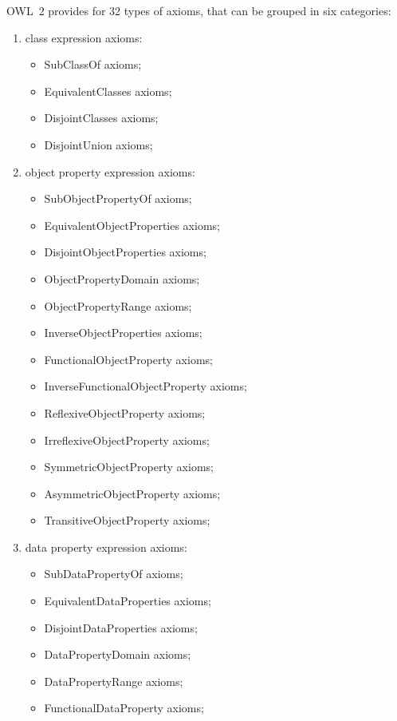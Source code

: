 \documentclass[a4paper]{article}
\newcounter{ex}
\begin{document}
OWL~2 provides for 32 types of axioms, that can be grouped in six categories:
\begin{enumerate}
\item class expression axioms:
  \begin{itemize}
  \item \textsf{SubClassOf} axioms;
  \item \textsf{EquivalentClasses} axioms;
  \item \textsf{DisjointClasses} axioms;
  \item \textsf{DisjointUnion} axioms;
  \end{itemize}
\item object property expression axioms:
  \begin{itemize}
  \item \textsf{SubObjectPropertyOf} axioms;
  \item \textsf{EquivalentObjectProperties} axioms;
  \item \textsf{DisjointObjectProperties} axioms;
  \item \textsf{ObjectPropertyDomain} axioms;
  \item \textsf{ObjectPropertyRange} axioms;
  \item \textsf{InverseObjectProperties} axioms;
  \item \textsf{FunctionalObjectProperty} axioms;
  \item \textsf{InverseFunctionalObjectProperty} axioms;
  \item \textsf{ReflexiveObjectProperty} axioms;
  \item \textsf{IrreflexiveObjectProperty} axioms;
  \item \textsf{SymmetricObjectProperty} axioms;
  \item \textsf{AsymmetricObjectProperty} axioms;
  \item \textsf{TransitiveObjectProperty} axioms;
  \end{itemize}
\item data property expression axioms:
  \begin{itemize}
  \item \textsf{SubDataPropertyOf} axioms;
  \item \textsf{EquivalentDataProperties} axioms;
  \item \textsf{DisjointDataProperties} axioms;
  \item \textsf{DataPropertyDomain} axioms;
  \item \textsf{DataPropertyRange} axioms;
  \item \textsf{FunctionalDataProperty} axioms;

\end{itemize}
\end{enumerate}
\end{document}
